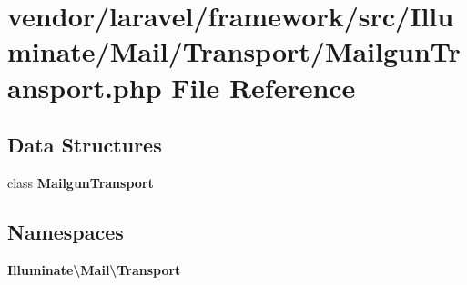 \section{vendor/laravel/framework/src/\+Illuminate/\+Mail/\+Transport/\+Mailgun\+Transport.php File Reference}
\label{_mailgun_transport_8php}
\subsection*{Data Structures}
\begin{DoxyCompactItemize}
\item 
class {\bf Mailgun\+Transport}
\end{DoxyCompactItemize}
\subsection*{Namespaces}
\begin{DoxyCompactItemize}
\item 
 {\bf Illuminate\textbackslash{}\+Mail\textbackslash{}\+Transport}
\end{DoxyCompactItemize}
